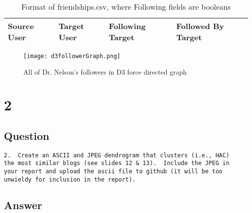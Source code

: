\documentclass[letterpaper,11pt]{article}
\begin{document}
\begin{table}[htb]
\centering
\begin{tabular}{ | l | l | l | l |}
\hline
\textbf{Source User} & \textbf{Target User} & \textbf{Following Target} & \textbf{Followed By Target} \\
\hline
\end{tabular}
\caption{Format of friendships.csv, where Following fields are booleans}
\label{table:q1csvtable}
\end{table}



\clearpage
 \begin{figure}[h]
 \centering
 \texttt{[image: d3followerGraph.png]}
 \caption{All of Dr. Nelson's followers in D3 force directed graph}
 \label{fig:q1friendshipgraph}
 \end{figure}


\clearpage


\section*{2}

\subsection*{Question}

\begin{verbatim}
2.  Create an ASCII and JPEG dendrogram that clusters (i.e., HAC)
the most similar blogs (see slides 12 & 13).  Include the JPEG in
your report and upload the ascii file to github (it will be too
unwieldy for inclusion in the report).
\end{verbatim}

\subsection*{Answer}





\clearpage

\end{document}
